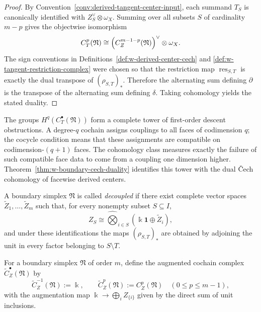 \begin{proof}
By Convention~\ref{conv:derived-tangent-center-input}, each summand $T_S$ is canonically
identified with $Z_S^\vee\otimes \omega_X$. Summing over all subsets $S$ of cardinality $m-p$
gives the objectwise isomorphism
\[
C_T^p(\mathfrak N)
\cong
\Bigl(C_Z^{m-1-p}(\mathfrak N)\Bigr)^\vee\otimes \omega_X.
\]
The sign conventions in Definitions~\ref{def:w-derived-center-cech} and
\ref{def:w-tangent-restriction-complex} were chosen so that the restriction map
$\operatorname{res}_{S,T}$ is exactly the dual transpose of $(\rho_{S,T})_*$. Therefore the alternating
sum defining $\partial$ is the transpose of the alternating sum defining $\delta$.
Taking cohomology yields the stated duality.
\end{proof}

\begin{remark}[Interpretation]
\label{rem:w-boundary-cech-interpretation}
The groups $H^q(C_T^\bullet(\mathfrak N))$ form a complete tower of first-order descent obstructions.
A degree-$q$ cochain assigns couplings to all faces of codimension $q$; the cocycle condition means
that these assignments are compatible on codimension-$(q+1)$ faces. The cohomology class measures
exactly the failure of such compatible face data to come from a coupling one dimension higher.
Theorem~\ref{thm:w-boundary-cech-duality} identifies this tower with the dual \v{C}ech cohomology of
facewise derived centers.
\end{remark}

\begin{definition}
\label{def:w-decoupled-simplex}
A boundary simplex $\mathfrak N$ is called \emph{decoupled} if there exist complete vector spaces
$\widetilde Z_1,\dots,\widetilde Z_m$ such that, for every nonempty subset $S\subseteq I$,
\[
Z_S\cong \widehat\bigotimes_{i\in S}(\Bbbk\mathbf{1}\oplus \widetilde Z_i),
\]
and under these identifications the maps $(\rho_{S,T})_*$ are obtained by adjoining the unit in every
factor belonging to $S\setminus T$.
\end{definition}

\begin{definition}
\label{def:w-augmented-center-complex}
For a boundary simplex $\mathfrak N$ of order $m$, define the augmented cochain complex
$\widetilde C_Z^\bullet(\mathfrak N)$ by
\[
\widetilde C_Z^{-1}(\mathfrak N):=\Bbbk,
\qquad
\widetilde C_Z^p(\mathfrak N):=C_Z^p(\mathfrak N)\quad (0\le p\le m-1),
\]
with the augmentation map $\Bbbk\to \bigoplus_i Z_{\{i\}}$ given by the direct sum of unit inclusions.
\end{definition}

